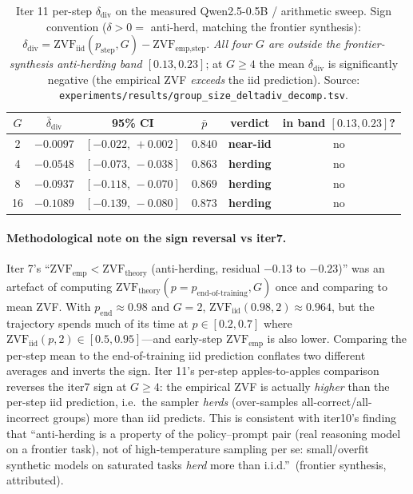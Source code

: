 \begin{table}[htbp]
\centering
\small
\begin{tabular}{cccccc}
\toprule
$G$ & $\bar\delta_\text{div}$ & 95\% CI & $\bar p$ & verdict & in band $[0.13, 0.23]$? \\
\midrule
2  & $-0.0097$ & $[-0.022,\,+0.002]$ & $0.840$ & \textbf{near-iid}        & no \\
4  & $-0.0548$ & $[-0.073,\,-0.038]$ & $0.863$ & \textbf{herding}         & no \\
8  & $-0.0937$ & $[-0.118,\,-0.070]$ & $0.869$ & \textbf{herding}         & no \\
16 & $-0.1089$ & $[-0.139,\,-0.080]$ & $0.873$ & \textbf{herding}         & no \\
\bottomrule
\end{tabular}
\caption{Iter 11 per-step $\delta_\text{div}$ on the measured
Qwen2.5-0.5B / arithmetic sweep. Sign convention
($\delta > 0 = $ anti-herd, matching the frontier synthesis):
$\delta_\text{div} = \mathrm{ZVF}_\text{iid}(p_\text{step}, G) -
\mathrm{ZVF}_\text{emp,step}$. \emph{All four $G$ are outside the
frontier-synthesis anti-herding band $[0.13, 0.23]$}; at $G \ge 4$
the mean $\delta_\text{div}$ is significantly negative (the empirical
ZVF \emph{exceeds} the iid prediction). Source:
\texttt{experiments/results/group\_size\_deltadiv\_decomp.tsv}.}
\label{tab:groupsize-deltadiv}
\end{table}

\paragraph{Methodological note on the sign reversal vs iter7.}
Iter 7's
``$\mathrm{ZVF}_\text{emp} < \mathrm{ZVF}_\text{theory}$ (anti-herding,
residual $-0.13$ to $-0.23$)'' was an artefact of computing
$\mathrm{ZVF}_\text{theory}(p{=}p_\text{end-of-training}, G)$ once and
comparing to mean ZVF. With $p_\text{end} \approx 0.98$ and $G{=}2$,
$\mathrm{ZVF}_\text{iid}(0.98, 2) \approx 0.964$, but the trajectory
spends much of its time at $p \in [0.2, 0.7]$ where
$\mathrm{ZVF}_\text{iid}(p, 2) \in [0.5, 0.95]$---and early-step
$\mathrm{ZVF}_\text{emp}$ is also lower. Comparing the per-step mean to
the end-of-training iid prediction conflates two different averages and
inverts the sign. Iter 11's per-step apples-to-apples comparison
reverses the iter7 sign at $G \ge 4$: the empirical ZVF is actually
\emph{higher} than the per-step iid prediction, i.e.\ the sampler
\emph{herds} (over-samples all-correct/all-incorrect groups) more than
iid predicts. This is consistent with iter10's finding that
``anti-herding is a property of the policy--prompt pair (real reasoning
model on a frontier task), not of high-temperature sampling per se:
small/overfit synthetic models on saturated tasks \emph{herd} more than
i.i.d.''~(frontier synthesis, attributed).

